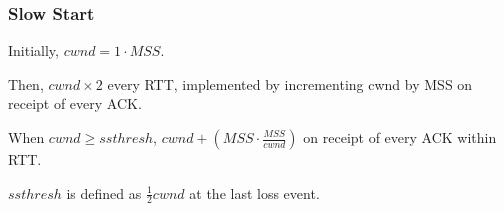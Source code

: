 \subsubsection{Slow Start}

Initially, $cwnd=1\cdot MSS$.

Then, $cwnd\times 2$ every RTT, implemented by incrementing cwnd by MSS on receipt of every ACK.

When $cwnd\geq ssthresh$, $cwnd + (MSS\cdot\frac{MSS}{cwnd})$ on receipt of every ACK within RTT.

$ssthresh$ is defined as $\frac{1}{2}cwnd$ at the last loss event.